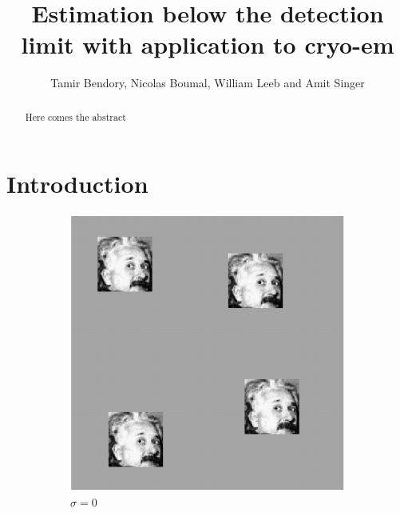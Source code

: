 \documentclass[english,11pt]{article}
\newcommand{\1}{\mathbf{1}}
\numberwithin{equation}{section}
\theoremstyle{plain}
\theoremstyle{definition}
\theoremstyle{remark}
\theoremstyle{plain}
\theoremstyle{remark}
\theoremstyle{plain}
\theoremstyle{plain}
\begin{document}
\title{Estimation below the detection limit with application to cryo-em}


\author{Tamir Bendory, Nicolas Boumal, William Leeb and Amit Singer}
\maketitle

\begin{abstract}
	Here comes the abstract
\end{abstract}

\section{Introduction}

\begin{figure}[t]
	\centering
	\begin{subfigure}[h]{0.33\textwidth}
		\centering
		\includegraphics[scale=0.5]{micrograph_Einstein_example_clean}
		\caption{$\sigma = 0$}
	\end{subfigure}%
	\begin{subfigure}[h]{0.33\textwidth}
		\centering

\end{subfigure}
\end{figure}
\end{document}
